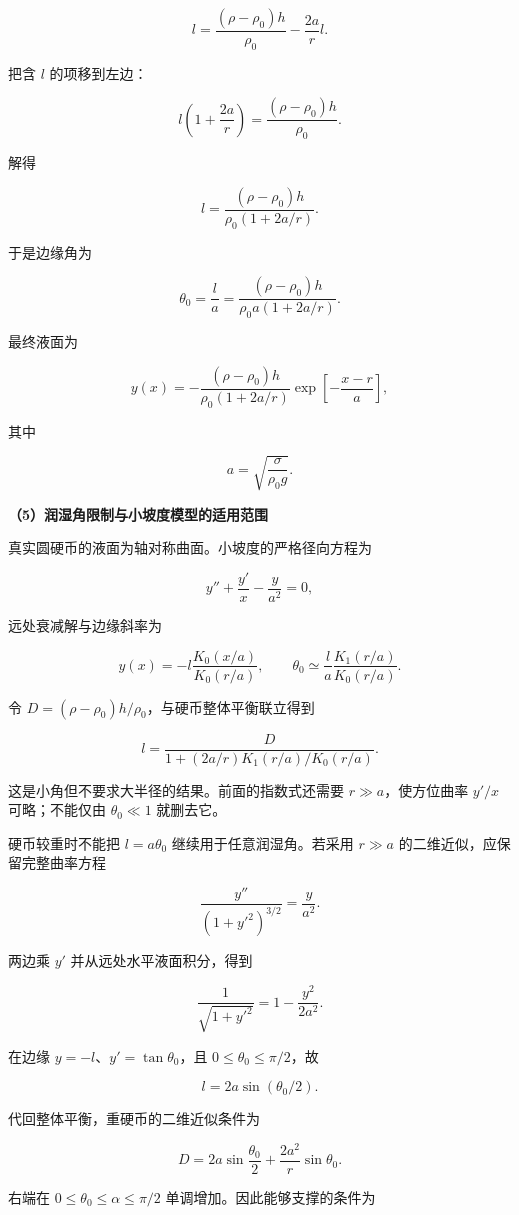 \documentclass[12pt,a4paper,UTF8]{ctexart}
\begin{document}
\[
l=\frac{(\rho-\rho_0)h}{\rho_0}-\frac{2a}{r}l.
\]

把含 \(l\) 的项移到左边：

\[
l\left(1+\frac{2a}{r}\right)
=\frac{(\rho-\rho_0)h}{\rho_0}.
\]

解得

\[
\boxed{
l=
\frac{(\rho-\rho_0)h}
{\rho_0\left(1+2a/r\right)}
}.
\]

于是边缘角为

\[
\boxed{
\theta_0=\frac la
=\frac{(\rho-\rho_0)h}
{\rho_0a\left(1+2a/r\right)}
}.
\]

最终液面为

\[
\boxed{
y(x)=
-\frac{(\rho-\rho_0)h}
{\rho_0\left(1+2a/r\right)}
\exp\left[-\frac{x-r}{a}\right]
},
\]

其中

\[
\boxed{a=\sqrt{\frac{\sigma}{\rho_0g}}}.
\]

\textbf{（5）润湿角限制与小坡度模型的适用范围}

真实圆硬币的液面为轴对称曲面。小坡度的严格径向方程为

\[y''+\frac{y'}x-\frac y{a^2}=0,\]

远处衰减解与边缘斜率为

\[y(x)=-l\frac{K_0(x/a)}{K_0(r/a)},\qquad
\theta_0\simeq\frac la\frac{K_1(r/a)}{K_0(r/a)}.\]

令 \(D=(\rho-\rho_0)h/\rho_0\)，与硬币整体平衡联立得到

\[\boxed{l=\frac D{1+(2a/r)K_1(r/a)/K_0(r/a)}}.\]

这是小角但不要求大半径的结果。前面的指数式还需要 \(r\gg a\)，使方位曲率
\(y'/x\) 可略；不能仅由 \(\theta_0\ll1\) 就删去它。

硬币较重时不能把 \(l=a\theta_0\) 继续用于任意润湿角。若采用 \(r\gg a\)
的二维近似，应保留完整曲率方程

\[\frac{y''}{(1+y'^2)^{3/2}}=\frac y{a^2}.\]

两边乘 \(y'\) 并从远处水平液面积分，得到

\[\frac1{\sqrt{1+y'^2}}=1-\frac{y^2}{2a^2}.\]

在边缘 \(y=-l\)、\(y'=\tan\theta_0\)，且 \(0\le\theta_0\le\pi/2\)，故

\[\boxed{l=2a\sin(\theta_0/2)}.\]

代回整体平衡，重硬币的二维近似条件为

\[D=2a\sin\frac{\theta_0}2+\frac{2a^2}r\sin\theta_0.\]

右端在 \(0\le\theta_0\le\alpha\le\pi/2\) 单调增加。因此能够支撑的条件为
\end{document}
